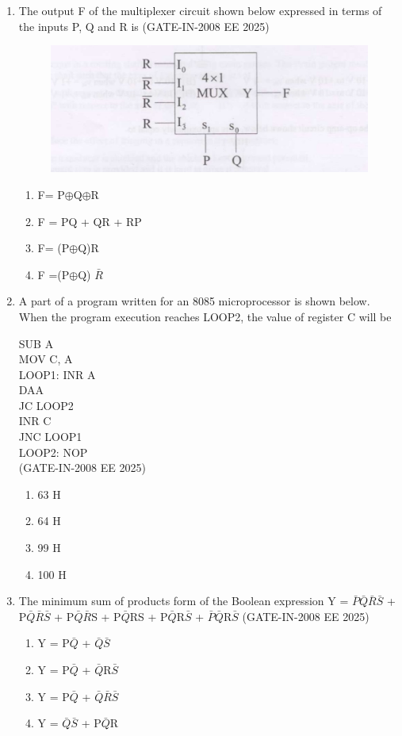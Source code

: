 \documentclass[journal,12pt,onecolumn]{IEEEtran}
\theoremstyle{remark}
\begin{document}
\begin{enumerate}[label=Q.\arabic*,start=1]
    \item  The output F of the multiplexer circuit shown below expressed in terms of the inputs P, Q and R is (GATE-IN-2008 EE 2025)
    \begin{figure}[H]
    \centering
    \includegraphics[width=0.5\linewidth]{figs/i23.jpg}
    \label{fig:placeholder23}
\end{figure}
    \begin{enumerate} 
        \item  F= P$\oplus$Q$\oplus$R
        \item  F = PQ + QR + RP
        \item  F= (P$\oplus$Q)R
        \item  F =(P$\oplus$Q) $\bar{R}$
    \end{enumerate}
    
    \item A part of a program written for an 8085 microprocessor is shown below. When the program
execution reaches LOOP2, the value of register C will be

 SUB A\\ 
 MOV C, A  \\
 LOOP1: INR A\\  
    DAA  \\
    JC LOOP2\\  
    INR C  \\
    JNC LOOP1\\  
LOOP2: NOP\\
 (GATE-IN-2008 EE 2025)
    \begin{enumerate} 
        \item 63 H
        \item 64 H
        \item 99 H
        \item 100 H
    \end{enumerate}
    
    \item  The minimum sum of products form of the Boolean expression Y = $\bar{P}$$\bar{Q}$$\bar{R}$$\bar{S}$ + P$\bar{Q}$$\bar{R}$$\bar{S}$ + P$\bar{Q}$$\bar{R}$S + P$\bar{Q}$RS + P$\bar{Q}$R$\bar{S}$ + $\bar{P}$$\bar{Q}$R$\bar{S}$ (GATE-IN-2008 EE 2025)
    \begin{enumerate} 
        \item  Y = P$\bar{Q}$ + $\bar{Q}$$\bar{S}$
        \item  Y = P$\bar{Q}$ + $\bar{Q}$R$\bar{S}$
        \item  Y = P$\bar{Q}$ + $\bar{Q}$$\bar{R}$$\bar{S}$
        \item  Y = $\bar{Q}$$\bar{S}$ + P$\bar{Q}$R
    \end{enumerate}
    

\end{enumerate}
\end{document}
